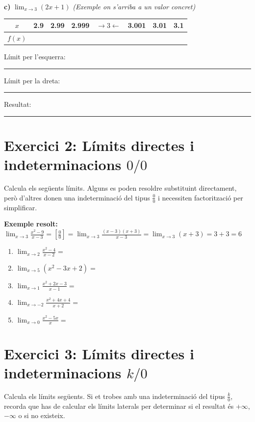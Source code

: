 \documentclass[12pt,a4paper]{article}
\begin{document}
\vspace{0.5cm}
\textbf{c)} $\lim_{x \to 3} (2x + 1)$ \textit{(Exemple on s'arriba a un valor concret)}

\begin{center}
\begin{tabular}{|c|c|c|c|c|c|c|c|}
\hline
$x$ & 2.9 & 2.99 & 2.999 & $\rightarrow 3 \leftarrow$ & 3.001 & 3.01 & 3.1 \\
\hline
$f(x)$ & & & & & & & \\
\hline
\end{tabular}
\end{center}
Límit per l'esquerra: \rule{2cm}{0.1mm} \hspace{1cm} Límit per la dreta: \rule{2cm}{0.1mm} \hspace{1cm} Resultat: \rule{2cm}{0.1mm}

\newpage

\section*{Exercici 2: Límits directes i indeterminacions $0/0$}
Calcula els següents límits. Alguns es poden resoldre substituint directament, però d'altres donen una indeterminació del tipus $\frac{0}{0}$ i necessiten factorització per simplificar.

\textbf{Exemple resolt:} 
$\lim_{x \to 3} \frac{x^2 - 9}{x - 3} = \left[ \frac{0}{0} \right] = \lim_{x \to 3} \frac{(x-3)(x+3)}{x-3} = \lim_{x \to 3} (x+3) = 3 + 3 = 6$

\begin{enumerate}[label=\textbf{\alph*)}]
    \itemsep1.5em
    \item $\lim_{x \to 2} \frac{x^2 - 4}{x - 2} =$
    \item $\lim_{x \to 5} (x^2 - 3x + 2) =$ 
    \item $\lim_{x \to 1} \frac{x^2 + 2x - 3}{x - 1} =$
    \item $\lim_{x \to -2} \frac{x^2 + 4x + 4}{x + 2} =$
    \item $\lim_{x \to 0} \frac{x^2 - 5x}{x} =$
\end{enumerate}

\vspace{1cm}

\section*{Exercici 3: Límits directes i indeterminacions $k/0$}
Calcula els límits següents. Si et trobes amb una indeterminació del tipus $\frac{k}{0}$, recorda que has de calcular els límits laterals per determinar si el resultat és $+\infty$, $-\infty$ o si no existeix.
\end{document}
